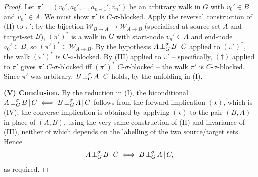 \documentclass[main]{subfiles}
\begin{document}
\begin{proof}
Let $\pi' = (v_0', a_0', \dots, a_{n-1}', v_n')$ be an arbitrary walk in $G$ with $v_0' \in B$ and $v_n' \in A$. We must show $\pi'$ is $C$-$\sigma$-blocked. Apply the reversal construction of (II) to $\pi'$: by the bijection $\mathcal{W}_{B \to A} \to \mathcal{W}_{A \to B}$ (specialised at source-set $A$ and target-set $B$), $(\pi')^*$ is a walk in $G$ with start-node $v_n' \in A$ and end-node $v_0' \in B$, so $(\pi')^* \in \mathcal{W}_{A \to B}$. By the hypothesis $A \operatorname{\perp}^{\sigma}_G B \operatorname{|} C$ applied to $(\pi')^*$, the walk $(\pi')^*$ is $C$-$\sigma$-blocked. By (III) applied to $\pi'$ -- specifically, $(\dagger)$ applied to $\pi'$ gives $\pi'$ $C$-$\sigma$-blocked iff $(\pi')^*$ $C$-$\sigma$-blocked -- the walk $\pi'$ is $C$-$\sigma$-blocked. Since $\pi'$ was arbitrary, $B \operatorname{\perp}^{\sigma}_G A \operatorname{|} C$ holds, by the unfolding in (I).

\medskip\noindent\textbf{(V) Conclusion.}
By the reduction in (I), the biconditional $A \operatorname{\perp}^{\sigma}_G B \operatorname{|} C \iff B \operatorname{\perp}^{\sigma}_G A \operatorname{|} C$ follows from the forward implication $(\star)$, which is (IV); the converse implication is obtained by applying $(\star)$ to the pair $(B, A)$ in place of $(A, B)$, using the very same construction of (II) and invariance of (III), neither of which depends on the labelling of the two source/target sets. Hence
\[
    A \operatorname{\perp}^{\sigma}_G B \operatorname{|} C \iff B \operatorname{\perp}^{\sigma}_G A \operatorname{|} C,
\]
as required.
\end{proof}
\end{document}
